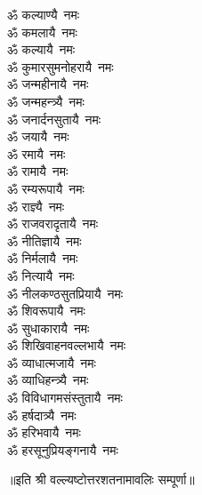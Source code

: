 \begin{flushleft}
\begin{multicols}{2}
ॐ कल्याण्यै~नमः\\
ॐ कमलायै~नमः\\
ॐ कल्यायै~नमः\\
ॐ कुमारसुमनोहरायै~नमः\\
ॐ जन्महीनायै~नमः\\
ॐ जन्महन्त्र्यै~नमः\\
ॐ जनार्दनसुतायै~नमः\\
ॐ जयायै~नमः\hfill{}\\
ॐ रमायै~नमः\\
ॐ रामायै~नमः\\
ॐ रम्यरूपायै~नमः\\
ॐ राज्ञ्यै~नमः\\
ॐ राजवरादृतायै~नमः\\
ॐ नीतिज्ञायै~नमः\\
ॐ निर्मलायै~नमः\\
ॐ नित्यायै~नमः\\
ॐ नीलकण्ठसुतप्रियायै~नमः\\
ॐ शिवरूपायै~नमः\hfill{}\\
ॐ सुधाकारायै~नमः\\
ॐ शिखिवाहनवल्लभायै~नमः\\
ॐ व्याधात्मजायै~नमः\\
ॐ व्याधिहन्त्र्यै~नमः\\
ॐ विविधागमसंस्तुतायै~नमः\\
ॐ हर्षदात्र्यै~नमः\\
ॐ हरिभवायै~नमः\\
ॐ हरसूनुप्रियङ्गनायै~नमः\\
\end{multicols}
\end{flushleft}
॥इति श्री वल्ल्यष्टोत्तरशतनामावलिः सम्पूर्णा॥



